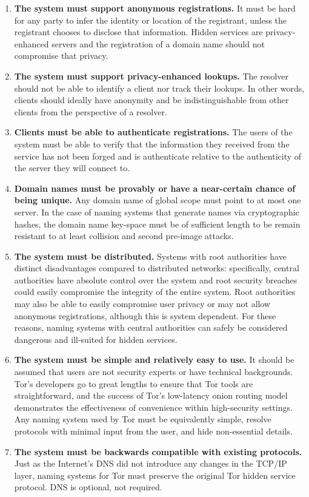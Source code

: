 \begin{enumerate}
	\item \textbf{The system must support anonymous registrations.} It must be hard for any party to infer the identity or location of the registrant, unless the registrant chooses to disclose that information. Hidden services are privacy-enhanced servers and the registration of a domain name should not compromise that privacy.
	\item \textbf{The system must support privacy-enhanced lookups.} The resolver should not be able to identify a client nor track their lookups. In other words, clients should ideally have anonymity and be indistinguishable from other clients from the perspective of a resolver.
	\item \textbf{Clients must be able to authenticate registrations.} The users of the system must be able to verify that the information they received from the service has not been forged and is authenticate relative to the authenticity of the server they will connect to. %
	\item \textbf{Domain names must be provably or have a near-certain chance of being unique.} Any domain name of global scope must point to at most one server. In the case of naming systems that generate names via cryptographic hashes, the domain name key-space must be of sufficient length to be remain resistant to at least collision and second pre-image attacks.
	\item \textbf{The system must be distributed.} Systems with root authorities have distinct disadvantages compared to distributed networks: specifically, central authorities have absolute control over the system and root security breaches could easily compromise the integrity of the entire system. Root authorities may also be able to easily compromise user privacy or may not allow anonymous registrations, although this is system dependent. For these reasons, naming systems with central authorities can safely be considered dangerous and ill-suited for hidden services.
	\item \textbf{The system must be simple and relatively easy to use.} It should be assumed that users are not security experts or have technical backgrounds. Tor's developers go to great lengths to ensure that Tor tools are straightforward, and the success of Tor's low-latency onion routing model demonstrates the effectiveness of convenience within high-security settings. Any naming system used by Tor must be equivalently simple, resolve protocols with minimal input from the user, and hide non-essential details.
	\item \textbf{The system must be backwards compatible with existing protocols.} Just as the Internet's DNS did not introduce any changes in the TCP/IP layer, naming systems for Tor must preserve the original Tor hidden service protocol. DNS is optional, not required.
\end{enumerate}

